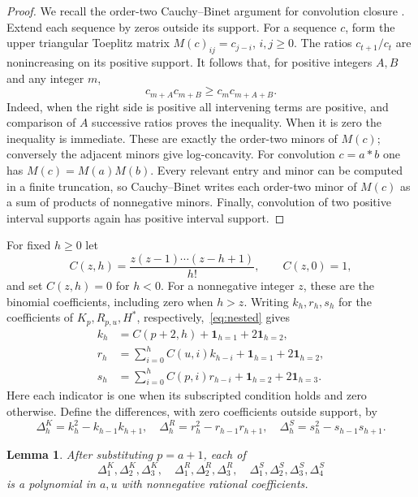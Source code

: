 \documentclass[11pt,a4paper]{article}
\newtheorem{lemma}[theorem]{Lemma}
\newcommand{\ind}{\mathbf{1}}
\begin{document}
\begin{proof}
We recall the order-two Cauchy--Binet argument for convolution closure
\cite[Section~2]{Gross2015}. Extend each sequence by zeros outside its
support. For a sequence $c$, form the upper triangular Toeplitz matrix
$M(c)_{ij}=c_{j-i}$, $i,j\geq0$.
The ratios $c_{t+1}/c_t$ are nonincreasing on its positive support. It follows
that, for positive integers $A,B$ and any integer $m$,
\[
 c_{m+A}c_{m+B}\geq c_m c_{m+A+B}.
\]
Indeed, when the right side is positive all intervening terms are positive,
and comparison of $A$ successive ratios proves the inequality. When it is
zero the inequality is immediate. These are exactly the order-two minors
of $M(c)$; conversely the adjacent minors give log-concavity.
For convolution $c=a*b$ one has $M(c)=M(a)M(b)$.
Every relevant entry and minor can be computed in a finite truncation, so
Cauchy--Binet writes each order-two minor of $M(c)$ as a sum of products of
nonnegative minors. Finally, convolution of two positive interval supports
again has positive interval support.
\end{proof}

For fixed $h\geq0$ let
\[
 C(z,h)=\frac{z(z-1)\cdots(z-h+1)}{h!},\qquad C(z,0)=1,
\]
and set $C(z,h)=0$ for $h<0$. For a nonnegative integer $z$, these are
the binomial coefficients, including zero when $h>z$.
Writing $k_h,r_h,s_h$ for the coefficients of $K_p,R_{p,u},H^*$,
respectively,~\eqref{eq:nested} gives
\begin{equation}\label{eq:coefficients}
\begin{aligned}
 k_h&=C(p+2,h)+\ind_{h=1}+2\ind_{h=2},\\
 r_h&=\sum_{i=0}^h C(u,i)k_{h-i}+\ind_{h=1}+2\ind_{h=2},\\
 s_h&=\sum_{i=0}^h C(p,i)r_{h-i}+\ind_{h=2}+2\ind_{h=3}.
\end{aligned}
\end{equation}
Here each indicator is one when its subscripted condition holds and zero
otherwise. Define the differences, with zero coefficients outside support, by
\[
 \Delta^K_h=k_h^2-k_{h-1}k_{h+1},\quad
 \Delta^R_h=r_h^2-r_{h-1}r_{h+1},\quad
 \Delta^S_h=s_h^2-s_{h-1}s_{h+1}.
\]

\begin{lemma}\label{lem:certificates}
After substituting $p=a+1$, each of
\[
 \Delta^K_1,\Delta^K_2,\Delta^K_3,\quad
 \Delta^R_1,\Delta^R_2,\Delta^R_3,\quad
 \Delta^S_1,\Delta^S_2,\Delta^S_3,\Delta^S_4
\]
is a polynomial in $a,u$ with nonnegative rational coefficients.
\end{lemma}
\end{document}

